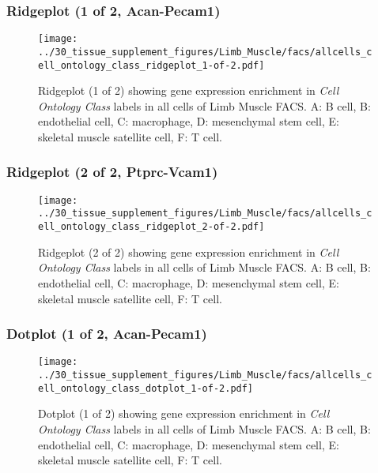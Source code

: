 \clearpage

\subsubsection{Ridgeplot (1 of 2, Acan-Pecam1)}
\begin{figure}[h]
\centering
\texttt{[image: ../30\_tissue\_supplement\_figures/Limb\_Muscle/facs/allcells\_cell\_ontology\_class\_ridgeplot\_1-of-2.pdf]}

\caption{ Ridgeplot (1 of 2)  showing gene expression enrichment in \emph{Cell Ontology Class} labels in all cells of Limb Muscle FACS. A: B cell, B: endothelial cell, C: macrophage, D: mesenchymal stem cell, E: skeletal muscle satellite cell, F: T cell.}
\end{figure}


\clearpage

\subsubsection{Ridgeplot (2 of 2, Ptprc-Vcam1)}
\begin{figure}[h]
\centering
\texttt{[image: ../30\_tissue\_supplement\_figures/Limb\_Muscle/facs/allcells\_cell\_ontology\_class\_ridgeplot\_2-of-2.pdf]}

\caption{ Ridgeplot (2 of 2)  showing gene expression enrichment in \emph{Cell Ontology Class} labels in all cells of Limb Muscle FACS. A: B cell, B: endothelial cell, C: macrophage, D: mesenchymal stem cell, E: skeletal muscle satellite cell, F: T cell.}
\end{figure}


\clearpage

\subsubsection{Dotplot (1 of 2, Acan-Pecam1)}
\begin{figure}[h]
\centering
\texttt{[image: ../30\_tissue\_supplement\_figures/Limb\_Muscle/facs/allcells\_cell\_ontology\_class\_dotplot\_1-of-2.pdf]}

\caption{ Dotplot (1 of 2)  showing gene expression enrichment in \emph{Cell Ontology Class} labels in all cells of Limb Muscle FACS. A: B cell, B: endothelial cell, C: macrophage, D: mesenchymal stem cell, E: skeletal muscle satellite cell, F: T cell.}
\end{figure}


\clearpage

